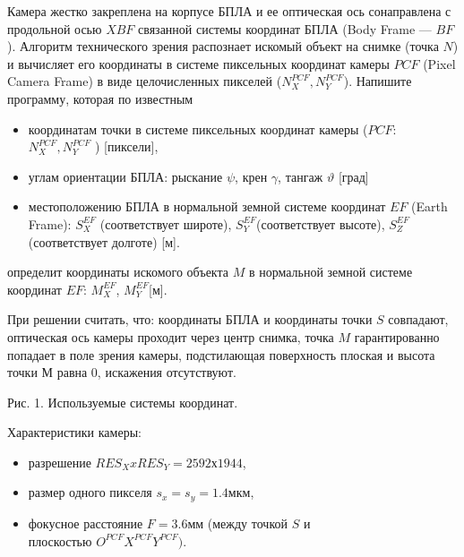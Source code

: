
Камера жестко закреплена на корпусе БПЛА и ее оптическая ось сонаправлена с
продольной осью $XBF$ связанной системы координат БПЛА (Body Frame — $BF$). Алгоритм технического зрения распознает искомый объект на снимке (точка $N$) и вычисляет его координаты в системе пиксельных
координат камеры $PCF$ (Pixel Camera Frame) в виде целочисленных пикселей ($N^{PCF}_X, N^{PCF}_Y$). 
Напишите программу, которая по известным 

\begin{itemize}
    \item координатам точки в системе пиксельных координат камеры ($PCF$: \linebreak $N^{PCF}_X, N^{PCF}_Y$ ) [пиксели],
    \item углам ориентации БПЛА: рыскание $ \psi $, крен $ \gamma $, тангаж $ \vartheta $ [град]
    \item местоположению БПЛА в нормальной земной системе координат $EF$ (Earth Frame): $ S_X^{EF}$ 
    (соответствует широте), 
    $ S_Y^{EF} $(соответствует высоте), \linebreak $ S_Z^{EF} $(соответствует долготе) [м].
\end{itemize}

определит координаты искомого объекта $ M $ в нормальной земной системе координат $ EF $: $ M_X^{EF} $, $ M_Y^{EF} $[м].
 
При решении считать, что: координаты БПЛА и координаты точки $ S $ совпадают, оптическая ось камеры проходит через центр снимка, точка $ M $ гарантированно попадает в поле зрения камеры, подстилающая поверхность плоская и высота точки М равна 0, искажения отсутствуют.


Рис. 1. Используемые системы координат.

Характеристики камеры:

\begin{itemize}
    \item разрешение $RES_X x RES_Y = 2592 х 1944$,
    \item размер одного пикселя $s_x = s_y = 1.4 \text{мкм}$,
    \item фокусное расстояние $ F = 3.6 \text{мм}$ (между точкой $S$ и \\ плоскостью $O^{PCF}X^{PCF}Y^{PCF}) $.
\end{itemize}


